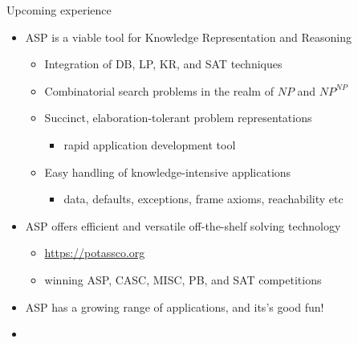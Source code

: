 \begin{frame}{Upcoming experience}
  \smallskip
  \begin{itemize}
  \item ASP is a viable tool for Knowledge Representation and Reasoning
    \begin{itemize}
    \item Integration of DB, LP, KR, and SAT techniques
    \item Combinatorial search problems in the realm of $\mathit{NP}$ and $\mathit{NP}^\mathit{NP}$
    \item Succinct, elaboration-tolerant problem representations
      \begin{itemize}\small
      \item rapid application development tool
      \end{itemize}
      \smallskip
    \item Easy handling of knowledge-intensive applications
      \begin{itemize}\small
      \item
        data,
        defaults,
        exceptions,
        frame axioms,
        reachability
        etc
      \end{itemize}
    \end{itemize}
      \smallskip
  \item ASP offers efficient and versatile off-the-shelf solving technology
    \begin{itemize}
    \item \alert{\url{https://potassco.org}}
    \item winning ASP, CASC, MISC, PB, and SAT competitions
    \end{itemize}
      \smallskip
  \item ASP has a growing range of applications, and its's good fun!
    \bigskip
  \item []
    \begin{quote}\qquad
    \end{quote}
    \smallskip
  \end{itemize}
\end{frame}
%
